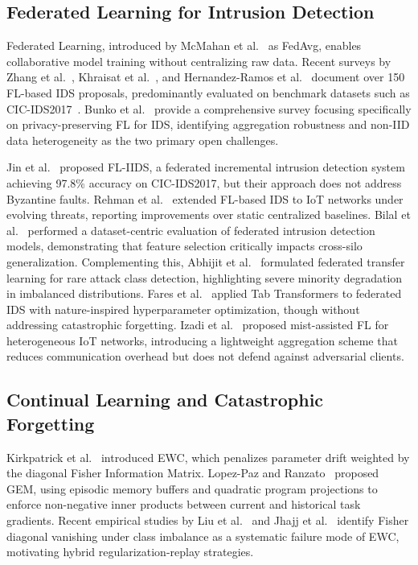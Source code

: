 \documentclass[journal,10pt,twocolumn]{IEEEtran}
\begin{document}
\subsection{Federated Learning for Intrusion Detection}
Federated Learning, introduced by McMahan et al.~\cite{mcmahan2017communication} as FedAvg, enables collaborative model training without centralizing raw data. Recent surveys by Zhang et al.~\cite{zhang2025survey}, Khraisat et al.~\cite{alazab2024survey}, and Hernandez-Ramos et al.~\cite{hernandez2025intrusion} document over 150 FL-based IDS proposals, predominantly evaluated on benchmark datasets such as CIC-IDS2017~\cite{sharafaldin2018toward}. Bunko et al.~\cite{bunko2026survey} provide a comprehensive survey focusing specifically on privacy-preserving FL for IDS, identifying aggregation robustness and non-IID data heterogeneity as the two primary open challenges.

Jin et al.~\cite{jin2024fliids} proposed FL-IIDS, a federated incremental intrusion detection system achieving 97.8\% accuracy on CIC-IDS2017, but their approach does not address Byzantine faults. Rehman et al.~\cite{rehman2026incremental} extended FL-based IDS to IoT networks under evolving threats, reporting improvements over static centralized baselines. Bilal et al.~\cite{bilal2026dataset} performed a dataset-centric evaluation of federated intrusion detection models, demonstrating that feature selection critically impacts cross-silo generalization. Complementing this, Abhijit et al.~\cite{abhijit2025federated} formulated federated transfer learning for rare attack class detection, highlighting severe minority degradation in imbalanced distributions. Fares et al.~\cite{fares2025federated} applied Tab Transformers to federated IDS with nature-inspired hyperparameter optimization, though without addressing catastrophic forgetting. Izadi et al.~\cite{izadi2025mist} proposed mist-assisted FL for heterogeneous IoT networks, introducing a lightweight aggregation scheme that reduces communication overhead but does not defend against adversarial clients.

\subsection{Continual Learning and Catastrophic Forgetting}
Kirkpatrick et al.~\cite{kirkpatrick2017overcoming} introduced EWC, which penalizes parameter drift weighted by the diagonal Fisher Information Matrix. Lopez-Paz and Ranzato~\cite{lopez2017gradient} proposed GEM, using episodic memory buffers and quadratic program projections to enforce non-negative inner products between current and historical task gradients. Recent empirical studies by Liu et al.~\cite{liu2026ewc} and Jhajj et al.~\cite{jhajj2025elastic} identify Fisher diagonal vanishing under class imbalance as a systematic failure mode of EWC, motivating hybrid regularization-replay strategies.
\end{document}
